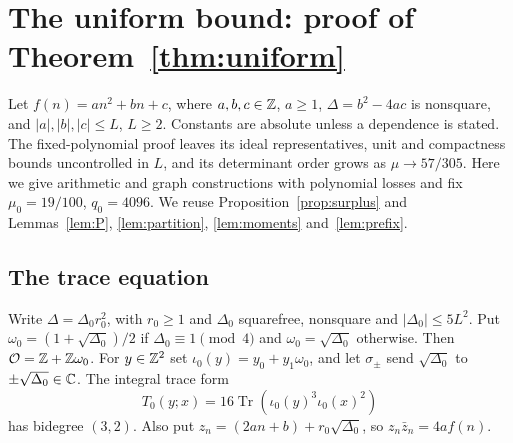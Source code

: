 \documentclass[11pt,reqno]{amsart}
\theoremstyle{definition}
\theoremstyle{remark}
\numberwithin{equation}{section}
\newcommand{\OO}{\mathcal O}
\begin{document}
\section{The uniform bound: proof of Theorem~\ref{thm:uniform}}\label{sec:uniform}
Let $f(n)=an^2+bn+c$, where $a,b,c\in\mathbb Z$, $a\ge1$,
$\Delta=b^2-4ac$ is nonsquare, and $|a|,|b|,|c|\le L$, $L\ge2$.
Constants are absolute unless a dependence is stated. The fixed-polynomial
proof leaves its ideal representatives, unit and compactness bounds
uncontrolled in $L$, and its determinant order grows as $\mu\to57/305$.
Here we give arithmetic and graph constructions with polynomial losses
and fix $\mu_0=19/100$, $q_0=4096$. We reuse
Proposition~\ref{prop:surplus} and Lemmas~\ref{lem:P}, \ref{lem:partition},
\ref{lem:moments} and~\ref{lem:prefix}.

\subsection{The trace equation}
Write $\Delta=\Delta_0r_0^2$, with $r_0\ge1$ and $\Delta_0$ squarefree,
nonsquare and $|\Delta_0|\le5L^2$. Put
$\omega_0=(1+\sqrt{\Delta_0})/2$ if $\Delta_0\equiv1\pmod4$ and
$\omega_0=\sqrt{\Delta_0}$ otherwise. Then $\OO=\Z+\Z\omega_0$.
For $y\in\mathbb Z^2$ set $\iota_0(y)=y_0+y_1\omega_0$, and let $\sigma_\pm$
send $\sqrt{\Delta_0}$ to $\pm\sqrt{\Delta_0}\in\mathbb C$.
The integral trace form
\[
 T_0(y;x)=16\operatorname{Tr}(\iota_0(y)^3\iota_0(x)^2)
\]
has bidegree $(3,2)$. Also put $z_n=(2an+b)+r_0\sqrt{\Delta_0}$,
so $z_n\bar z_n=4af(n)$.
\end{document}
